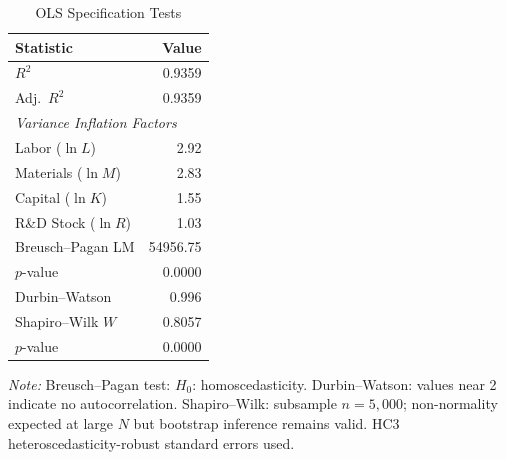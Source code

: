 \documentclass[a4paper, 12pt]{article}
\begin{document}
\begin{table}[htbp]
\centering
\caption{OLS Specification Tests}
\label{tab:ols_diagnostics}
\begin{tabular}{lr}
\toprule
Statistic & Value \\
\midrule
  $R^2$               & 0.9359 \\
  Adj.\ $R^2$         & 0.9359 \\
  \midrule
  \multicolumn{2}{l}{\textit{Variance Inflation Factors}} \\
  \quad Labor ($\ln L$) & 2.92 \\
  \quad Materials ($\ln M$) & 2.83 \\
  \quad Capital ($\ln K$) & 1.55 \\
  \quad R\&D Stock ($\ln R$) & 1.03 \\
  \midrule
  Breusch--Pagan LM & 54956.75 \\
  \quad $p$-value    & 0.0000 \\
  Durbin--Watson      & 0.996 \\
  Shapiro--Wilk $W$  & 0.8057 \\
  \quad $p$-value    & 0.0000 \\
\bottomrule
\end{tabular}
\begin{flushleft}
\footnotesize
\textit{Note:} Breusch--Pagan test: $H_0$: homoscedasticity.
Durbin--Watson: values near 2 indicate no autocorrelation.
Shapiro--Wilk: subsample $n=5{,}000$; non-normality expected
at large $N$ but bootstrap inference remains valid.
HC3 heteroscedasticity-robust standard errors used.
\end{flushleft}
\end{table}
\end{document}
